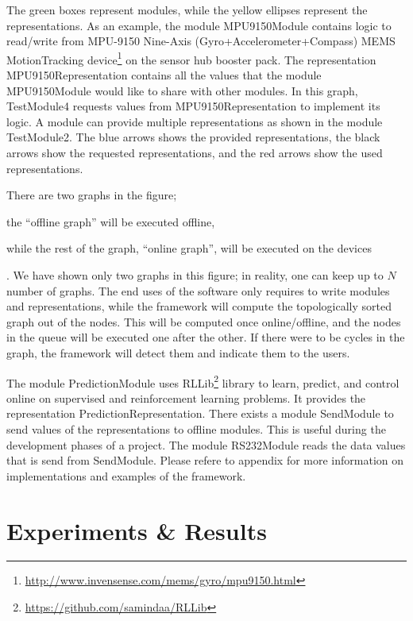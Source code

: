 \documentclass[letterpaper]{article}
\begin{document}
The green boxes represent modules, while the yellow ellipses represent the representations. As an
example, the module {\sf MPU9150Module} contains logic to read/write from MPU-9150 Nine-Axis
(Gyro+Accelerometer+Compass) MEMS MotionTracking
device\footnote{\url{http://www.invensense.com/mems/gyro/mpu9150.html}} on the sensor hub booster
pack. The representation {\sf MPU9150Representation} contains all the values that the module
{\sf MPU9150Module} would like to share with other modules. In this graph, {\sf TestModule4}
requests
values from {\sf MPU9150Representation} to implement its logic. A module can provide multiple
representations as shown in the module {\sf TestModule2}. The blue arrows shows the provided
representations, the black arrows show the requested representations, and the red arrows show the
used representations.

There are two graphs in the figure; \begin{inparaenum}[(1)] \item the ``offline graph'' will be
executed offline, \item while the rest
of the graph, ``online graph'', will be executed on the devices\end{inparaenum}. We have shown only
two graphs in
this figure; in reality, one can keep up to $N$ number of graphs. The end uses of the software only
requires to write modules and representations, while the framework will compute the
topologically sorted graph out of the nodes. This will be computed once online/offline, and the
nodes in the queue will be executed one after the other. If there were to be cycles in the graph,
the framework will detect them and indicate them to the users.

The module {\sf PredictionModule} uses {\sf
RLLib}\footnote{\url{https://github.com/samindaa/RLLib}} library to learn, predict, and control
online on supervised and reinforcement learning problems. It provides
the representation {\sf PredictionRepresentation}. There exists a module {\sf SendModule} to send
values of the representations to offline modules. This is useful during the development phases of
a project. The module {\sf RS232Module} reads the data values that is send from {\sf SendModule}.
Please refere  to appendix for more information on implementations and
examples of the framework.

\section{Experiments \& Results}
\end{document}
